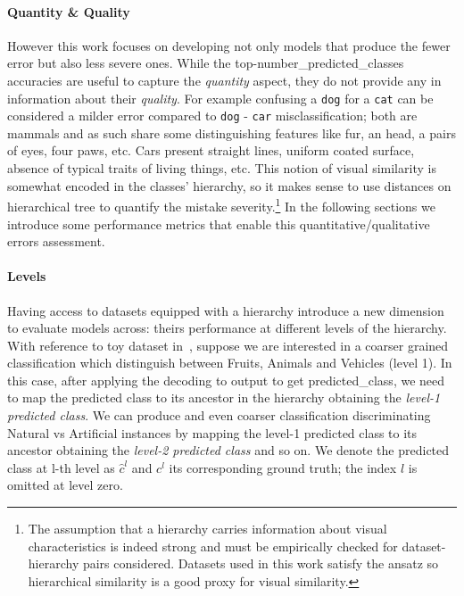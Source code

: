 \paragraph {Quantity \& Quality}
\label{par:metrics-quantity-quality}
However this work focuses on developing not only models that produce the fewer error but also less severe ones. While the top-\gls{number_predicted_classes} accuracies are useful to capture the \emph{quantity} aspect, they do not provide any in information about their \emph{quality}.
For example confusing a \texttt{dog} for a \texttt{cat} can be considered a milder error compared to \texttt{dog} - \texttt{car} misclassification; both are mammals and as such share some distinguishing features like fur, an head, a pairs of eyes, four paws, etc. Cars present straight lines, uniform coated surface, absence of typical traits of living things, etc.
This notion of visual similarity is somewhat encoded in the classes' hierarchy, so it makes sense to use distances on hierarchical tree to quantify the mistake severity.\footnote{The assumption that a hierarchy carries information about visual characteristics is indeed strong and must be empirically checked for dataset-hierarchy pairs considered.
Datasets used in this work satisfy the ansatz so hierarchical similarity is a good proxy for visual similarity.} In the following sections we introduce some performance metrics that enable this quantitative/qualitative errors assessment.

\paragraph {Levels}
\label{par:metrics-levels}
Having access to datasets equipped with a hierarchy introduce a new dimension to evaluate models across: theirs performance at different levels of the hierarchy.
With reference to toy dataset in~, suppose we are interested in a coarser grained classification which distinguish between Fruits, Animals and Vehicles (level 1). In this case, after applying the decoding to \gls{output} to get \gls{predicted_class}, we need to map the predicted class to its ancestor in the hierarchy obtaining the \emph{level-1 predicted class}. We can produce and even coarser classification discriminating Natural vs Artificial instances by mapping the level-1 predicted class to its ancestor obtaining the \emph{level-2 predicted class} and so on.
We denote the predicted class at l-th level as $\hat{c}^l$ and $c^l$ its corresponding ground truth; the index $l$ is omitted at level zero.

